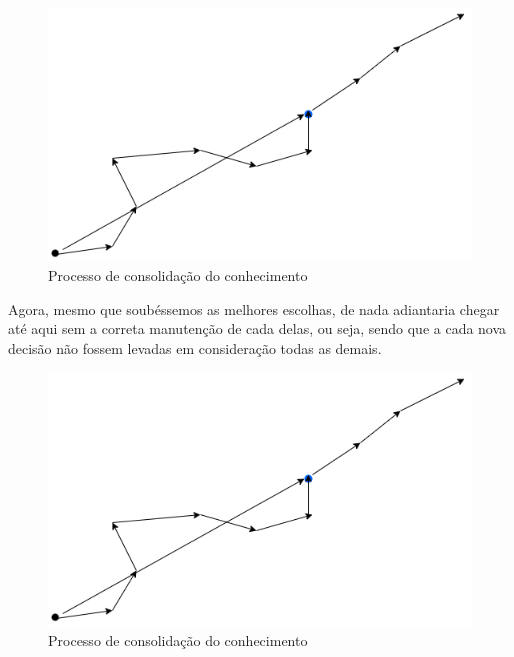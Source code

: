 \begin{figure}[H]
    \centering
    \includegraphics[scale=0.60,keepaspectratio=true]{images/02.png}
    \caption{Processo de consolidação do conhecimento}
    \label{knwledge_consolidation}
\end{figure}

Agora, mesmo que soubéssemos as melhores escolhas, de nada adiantaria chegar até aqui sem a correta manutenção de cada delas, ou seja, sendo que a cada nova decisão não fossem levadas em consideração todas as demais.

\begin{figure}[H]
    \centering
    \includegraphics[scale=0.60,keepaspectratio=true]{images/03.png}
    \caption{Processo de consolidação do conhecimento}
    \label{knowledge_maintenance}
\end{figure}

